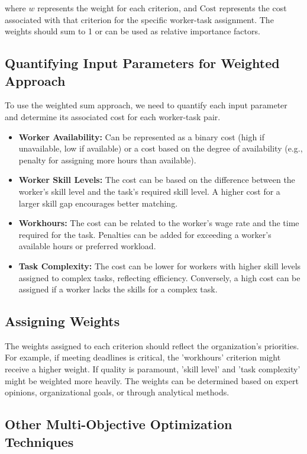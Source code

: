 \documentclass{article}
\begin{document}
where $w$ represents the weight for each criterion, and $\text{Cost}$ represents the cost associated with that criterion for the specific worker-task assignment. The weights should sum to 1 or can be used as relative importance factors.

\subsection{Quantifying Input Parameters for Weighted Approach}

To use the weighted sum approach, we need to quantify each input parameter and determine its associated cost for each worker-task pair.

\begin{itemize}
    \item \textbf{Worker Availability:} Can be represented as a binary cost (high if unavailable, low if available) or a cost based on the degree of availability (e.g., penalty for assigning more hours than available).
    \item \textbf{Worker Skill Levels:} The cost can be based on the difference between the worker's skill level and the task's required skill level. A higher cost for a larger skill gap encourages better matching.
    \item \textbf{Workhours:} The cost can be related to the worker's wage rate and the time required for the task. Penalties can be added for exceeding a worker's available hours or preferred workload.
    \item \textbf{Task Complexity:} The cost can be lower for workers with higher skill levels assigned to complex tasks, reflecting efficiency. Conversely, a high cost can be assigned if a worker lacks the skills for a complex task.
\end{itemize}

\subsection{Assigning Weights}

The weights assigned to each criterion should reflect the organization's priorities. For example, if meeting deadlines is critical, the 'workhours' criterion might receive a higher weight. If quality is paramount, 'skill level' and 'task complexity' might be weighted more heavily. The weights can be determined based on expert opinions, organizational goals, or through analytical methods.

\subsection{Other Multi-Objective Optimization Techniques}
\end{document}

